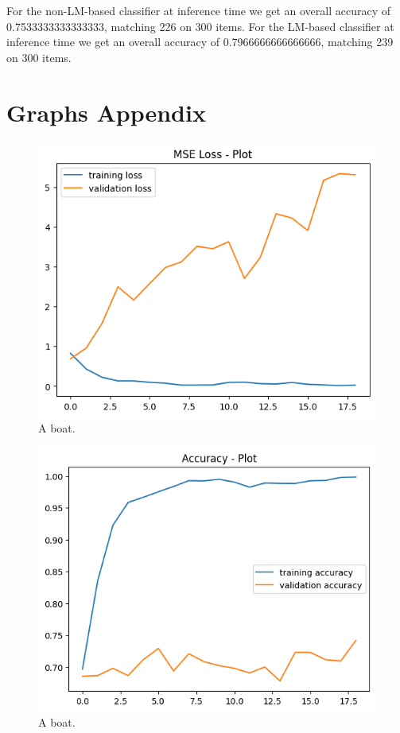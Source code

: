 \documentclass[11pt]{article}
\begin{document}
	For the non-LM-based classifier at inference time we get an overall accuracy of 0.7533333333333333, matching 226 on 300 items. For the LM-based classifier at inference time we get an overall accuracy of 0.7966666666666666, matching 239 on 300 items. 

	\appendix
	
		\section{Graphs Appendix}
	\label{sec:appendix}
	
	\begin{figure}
		\includegraphics[width=\linewidth]{loss-no-transformer.png}
		\caption{A boat.}
		\label{fig:1}
	\end{figure}
	
	\begin{figure}
		\includegraphics[width=\linewidth]{accuracy-no-transformer.png}
		\caption{A boat.}
		\label{fig:2}
	\end{figure}
	
\end{document}
